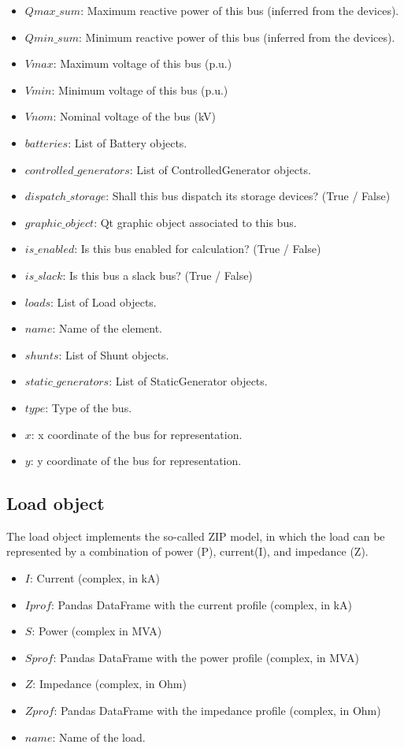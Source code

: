 \documentclass[11pt,fleqn]{book} %
\begin{document}
\begin{itemize}
	\item $Qmax\_sum$: Maximum reactive power of this bus (inferred from the devices).
	\item $Qmin\_sum$: Minimum reactive power of this bus (inferred from the devices).
	\item $Vmax$: Maximum voltage of this bus (p.u.)
	\item $Vmin$: Minimum voltage of this bus (p.u.)
	\item $Vnom$: Nominal voltage of the bus (kV)
	\item $batteries$: List of Battery objects.
	\item $controlled\_generators$: List of ControlledGenerator objects.
	\item $dispatch\_storage$: Shall this bus dispatch its storage devices?  (True / False)
	\item $graphic\_object$: Qt graphic object associated to this bus.
	\item $is\_enabled$: Is this bus enabled for calculation? (True / False)
	\item $is\_slack$: Is this bus a slack bus? (True / False)
	\item $loads$: List of Load objects.
	\item $name$: Name of the element.
	\item $shunts$: List of Shunt objects.
	\item $static\_generators$: List of StaticGenerator objects.
	\item $type$: Type of the bus.
	\item $x$: x coordinate of the bus for representation.
	\item $y$: y coordinate of the bus for representation.
\end{itemize}


\subsection{Load object}

The load object implements the so-called ZIP model, in which the load can be represented by a combination of power (P), current(I), and impedance (Z).

\begin{itemize}
	\item $I$: Current (complex, in kA)
	\item $Iprof$: Pandas DataFrame with the current profile (complex, in kA)
	\item $S$: Power (complex in MVA)
	\item $Sprof$: Pandas DataFrame with the power profile (complex, in MVA)
	\item $Z$: Impedance (complex, in Ohm)
	\item $Zprof$: Pandas DataFrame with the impedance profile (complex, in Ohm)
	\item $name$: Name of the load.
\end{itemize}
\end{document}
